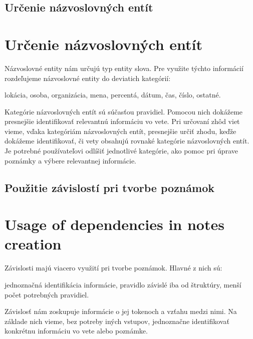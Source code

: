 %
%
{
	\subsection{Určenie názvoslovných entít}
}
{
	\section{Určenie názvoslovných entít}
}
\label{design:named_enitities}
Názvoslovné entity nám určujú typ entity slova. Pre využite týchto informácií rozdeľujeme názvoslovné entity do deviatich kategórií:
\begin{my_itemize}
	\myitem lokácia,
	\myitem osoba,
	\myitem organizácia,
	\myitem mena,
	\myitem percentá,
	\myitem dátum,
	\myitem čas,
	\myitem číslo,
	\myitem ostatné.
\end{my_itemize}

Kategórie názvoslovných entít sú súčasťou pravidiel. Pomocou nich dokážeme presnejšie identifikovať relevantnú informáciu vo vete. Pri určovaní zhôd viet vieme, vďaka kategóriám názvoslovných entít, presnejšie určiť zhodu, keďže dokážeme identifikovať, či vety obsahujú rovnaké kategórie názvoslovných entít. Je potrebné používateľovi odlíšiť jednotlivé kategórie, ako pomoc pri úprave poznámky a výbere relevantnej informácie.

%
%
{
	\subsection{Použitie závislostí pri tvorbe poznámok}
}
{
	\section{Usage of dependencies in notes creation}
}
\label{subsection:use_of_dependencies_in_notes_creation}
Závislosti majú viacero využití pri tvorbe poznámok. Hlavné z nich sú:

\begin{my_itemize}
	\myitem jednoznačná identifikácia informácie,
	\myitem pravidlo závislé iba od štruktúry,
	\myitem menší počet potrebných pravidiel.
\end{my_itemize}

Závislosť nám zoskupuje informácie o jej tokenoch a vzťahu medzi nimi. Na základe nich vieme, bez potreby iných vstupov, jednoznačne identifikovať konkrétnu informáciu vo vete alebo poznámke.


